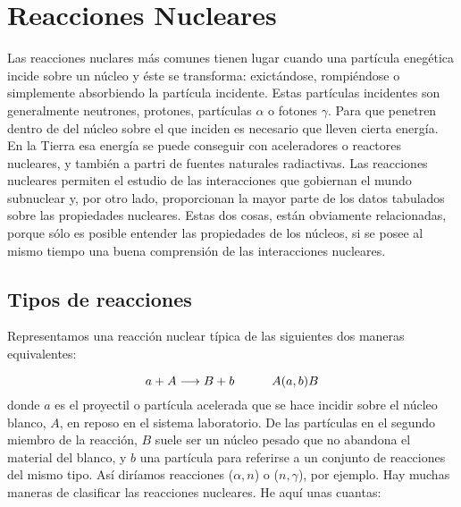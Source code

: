 \chapter{Reacciones Nucleares} \label{Ch:03}

Las reacciones nuclares más comunes tienen lugar cuando una partícula enegética incide sobre un núcleo y éste se transforma: exictándose, rompiéndose o simplemente absorbiendo la partícula incidente. Estas partículas incidentes son generalmente neutrones, protones, partículas $\alpha$ o fotones $\gamma$. Para que penetren dentro de del núcleo sobre el que inciden es necesario que lleven cierta energía. En la Tierra esa energía se puede conseguir con aceleradores o reactores nucleares, y también a partri de fuentes naturales radiactivas. Las reacciones nucleares permiten el estudio de las interacciones que gobiernan el mundo subnuclear y, por otro lado, proporcionan la mayor parte de los datos tabulados sobre las propiedades nucleares. Estas dos cosas, están obviamente relacionadas, porque sólo es posible entender las propiedades de los núcleos, si se posee al mismo tiempo una buena comprensión de las interacciones nucleares.


\section{Tipos de reacciones}

Representamos una reacción nuclear típica de las siguientes dos maneras equivalentes:

\begin{equation}
    a + A  \longrightarrow B + b \quad \quad \quad A(a,b)B \label{Ec:03-01-01}
\end{equation}
donde $a$ es el proyectil o partícula acelerada que se hace incidir sobre el núcleo blanco, $A$, en reposo en el sistema laboratorio. De las partículas en el segundo miembro de la reacción, $B$ suele ser un núcleo pesado que no abandona el material del blanco, y $b$ una partícula para referirse a un conjunto de reacciones del mismo tipo. Así diríamos reacciones ($\alpha,n$) o ($n,\gamma$), por ejemplo. Hay muchas maneras de clasificar las reacciones nucleares. He aquí unas cuantas:

